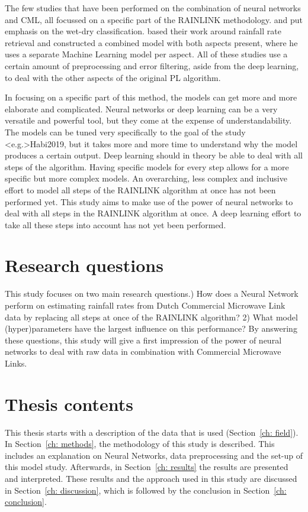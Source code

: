 \documentclass[twocolumn, 10pt, a4paper]{memoir}
\begin{document}
	The few studies that have been performed on the combination of neural networks and CML, all focussed on a specific part of the RAINLINK methodology.  and  put emphasis on the wet-dry classification.  based their work around rainfall rate retrieval and  constructed a combined model with both aspects present, where he uses a separate Machine Learning model per aspect. All of these studies use a certain amount of preprocessing and error filtering, aside from the deep learning, to deal with the other aspects of the original PL algorithm.
	
	In focusing on a specific part of this method, the models can get more and more elaborate and complicated. Neural networks or deep learning can be a very versatile and powerful tool, but they come at the expense of understandability. The models can be tuned very specifically to the goal of the study \shortcite<e.g.>{Habi2019}, but it takes more and more time to understand why the model produces a certain output. Deep learning should in theory be able to deal with all steps of the algorithm. Having specific models for every step allows for a more specific but more complex models. An overarching, less complex and inclusive effort to model all steps of the RAINLINK algorithm at once has not been performed yet. This study aims to make use of the power of neural networks to deal with all steps in the RAINLINK algorithm at once. A deep learning effort to take all these steps into account has not yet been performed. 
	
	
	\section{Research questions}
	This study focuses on two main research questions.) How does a Neural Network perform on estimating rainfall rates from Dutch Commercial Microwave Link data by replacing all steps at once of the RAINLINK algorithm?
	2) What model (hyper)parameters have the largest influence on this performance?
	By answering these questions, this study will give a first impression of the power of neural networks to deal with raw data in combination with Commercial Microwave Links.
	
	\section{Thesis contents}
	This thesis starts with a description of the data that is used (Section~\ref{ch: field}). In Section~\ref{ch: methods}, the methodology of this study is described. This includes an explanation on Neural Networks, data preprocessing and the set-up of this model study. Afterwards, in Section~\ref{ch: results} the results are presented and interpreted. These results and the approach used in this study are discussed in Section~\ref{ch: discussion}, which is followed by the conclusion in Section~\ref{ch: conclusion}.
	
\end{document}
